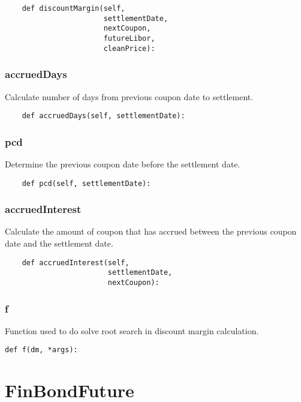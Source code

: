 \documentclass[twoside,11pt]{book}
\begin{document}
\begin{lstlisting}
    def discountMargin(self,
                       settlementDate,
                       nextCoupon,
                       futureLibor,
                       cleanPrice):
\end{lstlisting}

\subsubsection*{{\bf accruedDays}}
Calculate number of days from previous coupon date to settlement. 

\begin{lstlisting}
    def accruedDays(self, settlementDate):
\end{lstlisting}

\subsubsection*{{\bf pcd}}
Determine the previous coupon date before the settlement date.  

\begin{lstlisting}
    def pcd(self, settlementDate):
\end{lstlisting}

\subsubsection*{{\bf accruedInterest}}
Calculate the amount of coupon that has accrued between the previous coupon date and the settlement date.  

\begin{lstlisting}
    def accruedInterest(self,
                        settlementDate,
                        nextCoupon):
\end{lstlisting}

\subsubsection*{{\bf f}}
Function used to do solve root search in discount margin calculation.  

\begin{lstlisting}
def f(dm, *args):
\end{lstlisting}

\newpage
\section{FinBondFuture}
\end{document}
